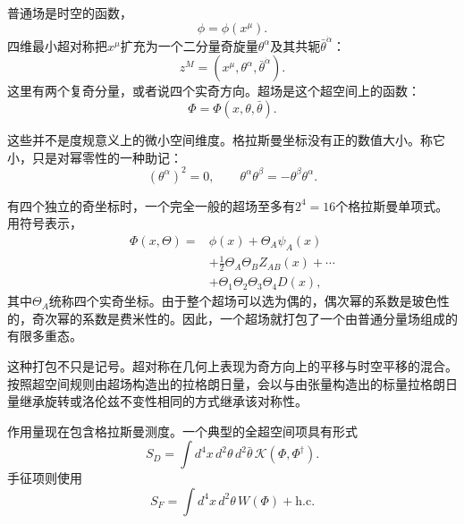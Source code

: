 普通场是时空的函数，
\begin{equation}
\phi=\phi(x^\mu).
\end{equation}
四维最小超对称把\(x^\mu\)扩充为一个二分量奇旋量\(\theta^\alpha\)及其共轭\(\bar\theta^{\dot\alpha}\)：
\begin{equation}
z^M=(x^\mu,\theta^\alpha,\bar\theta^{\dot\alpha}).
\end{equation}
这里有两个复奇分量，或者说四个实奇方向。超场是这个超空间上的函数：
\begin{equation}
\Phi=\Phi(x,\theta,\bar\theta).
\end{equation}

这些并不是度规意义上的微小空间维度。格拉斯曼坐标没有正的数值大小。称它小，只是对幂零性的一种助记：
\begin{equation}
(\theta^\alpha)^2=0,
\qquad
\theta^\alpha\theta^\beta=-\theta^\beta\theta^\alpha.
\end{equation}

有四个独立的奇坐标时，一个完全一般的超场至多有\(2^4=16\)个格拉斯曼单项式。用符号表示，
\begin{equation}
\begin{aligned}
\Phi(x,\Theta)={}&\phi(x)+\Theta_A\psi_A(x)\\
&+\frac{1}{2}\Theta_A\Theta_B Z_{AB}(x)+\cdots\\
&+\Theta_1\Theta_2\Theta_3\Theta_4D(x),
\end{aligned}
\end{equation}
其中\(\Theta_A\)统称四个实奇坐标。由于整个超场可以选为偶的，偶次幂的系数是玻色性的，奇次幂的系数是费米性的。因此，一个超场就打包了一个由普通分量场组成的有限多重态。

这种打包不只是记号。超对称在几何上表现为奇方向上的平移与时空平移的混合。按照超空间规则由超场构造出的拉格朗日量，会以与由张量构造出的标量拉格朗日量继承旋转或洛伦兹不变性相同的方式继承该对称性。

作用量现在包含格拉斯曼测度。一个典型的全超空间项具有形式
\begin{equation}
S_D=\int d^4x\,d^2\theta\,d^2\bar\theta\,
\mathcal K(\Phi,\Phi^\dagger).
\end{equation}
手征项则使用
\begin{equation}
S_F=\int d^4x\,d^2\theta\,W(\Phi)+\mathrm{h.c.}
\end{equation}

